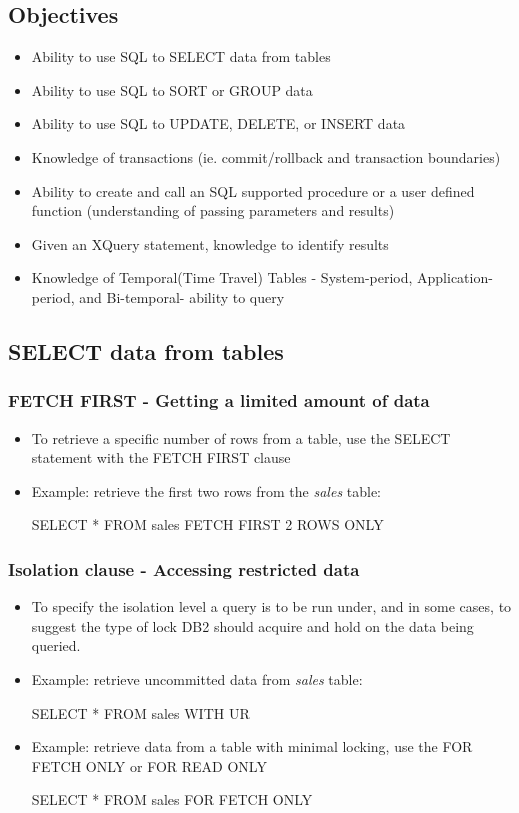 \documentclass{article}
\begin{document}
\subsection{Objectives}
\begin{itemize}
\item Ability to use SQL to SELECT data from tables
\item Ability to use SQL to SORT or GROUP data
\item Ability to use SQL to UPDATE, DELETE, or INSERT data
\item Knowledge of transactions (ie. commit/rollback and transaction boundaries)
\item Ability to create and call an SQL supported procedure or a user defined function (understanding
of passing parameters and results)
\item Given an XQuery statement, knowledge to identify results
\item Knowledge of Temporal(Time Travel) Tables - System-period, Application-period, and Bi-temporal-
ability to query
\end{itemize}

\subsection{SELECT data from tables}
\subsubsection{FETCH FIRST - Getting a limited amount of data}
\begin{itemize}
\item To retrieve a specific number of rows from a table, use the SELECT statement with the FETCH FIRST
clause
\item Example: retrieve the first two rows from the \textit{sales} table:
\begin{sqlcode}
SELECT * FROM sales FETCH FIRST 2 ROWS ONLY
\end{sqlcode}
\end{itemize}

\subsubsection{Isolation clause - Accessing restricted data}
\begin{itemize}
\item To specify the isolation level a query is to be run under, and in some cases, to suggest the type
of lock DB2 should acquire and hold on the data being queried.
\item Example: retrieve uncommitted data from \textit{sales} table:
\begin{sqlcode}
SELECT * FROM sales WITH UR
\end{sqlcode}
\item Example: retrieve data from a table with minimal locking, use the FOR FETCH ONLY or FOR READ ONLY
\begin{sqlcode}
SELECT * FROM sales FOR FETCH ONLY
\end{sqlcode}
\end{itemize}
\end{document}
